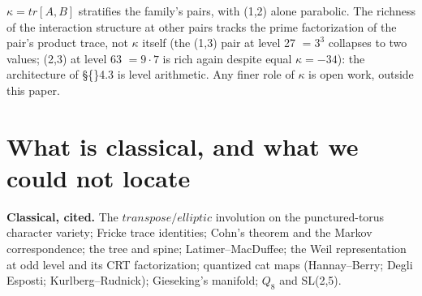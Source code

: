 \documentclass[11pt]{article}
\theoremstyle{plain}
\theoremstyle{definition}
\theoremstyle{remark}
\begin{document}
\(\kappa  = tr[A,B]\) stratifies the family's pairs, with (1,2) alone parabolic. The richness of the interaction structure at other pairs tracks the prime factorization of the pair's product trace, not \(\kappa \) itself (the (1,3) pair at level 27 \(= 3^{3}\) collapses to two values; (2,3) at level 63 \(= 9\cdot 7\) is rich again despite equal \(\kappa  = -34\)): the architecture of \S\{\}4.3 is level arithmetic. Any finer role of \(\kappa \) is open work, outside this paper.

\section{What is classical, and what we could not locate}

\textbf{Classical, cited.} The \(transpose/elliptic\) involution on the punctured-torus character variety; Fricke trace identities; Cohn's theorem and the Markov correspondence; the tree and spine; Latimer–MacDuffee; the Weil representation at odd level and its CRT factorization; quantized cat maps (Hannay–Berry; Degli Esposti; Kurlberg–Rudnick); Gieseking's manifold; \(Q_{8}\) and SL(2,5).
\end{document}
